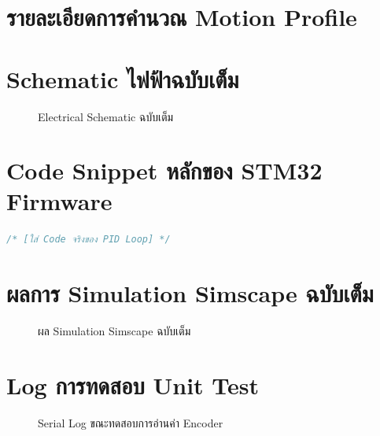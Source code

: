 \section{รายละเอียดการคำนวณ Motion Profile}
\label{sec:motion_profile_calculation_details}

\section{Schematic ไฟฟ้าฉบับเต็ม}
\label{sec:full_electrical_schematic}

\begin{figure}[H]
  \centering
  \caption{Electrical Schematic ฉบับเต็ม}
  \label{fig:schematic_full}
\end{figure}

\section{Code Snippet หลักของ STM32 Firmware}
\label{sec:firmware_code_snippets}

\begin{lstlisting}[language=C, caption={ตัวอย่าง PID Control Loop บน STM32}]
/* [ใส่ Code จริงของ PID Loop] */
\end{lstlisting}

\section{ผลการ Simulation Simscape ฉบับเต็ม}
\label{sec:simscape_simulation_results}

\begin{figure}[H]
  \centering
  \caption{ผล Simulation Simscape ฉบับเต็ม}
  \label{fig:simscape_full}
\end{figure}

\section{Log การทดสอบ Unit Test}
\label{sec:unit_test_logs}

\begin{figure}[H]
  \centering
  \caption{Serial Log ขณะทดสอบการอ่านค่า Encoder}
  \label{fig:serial_log}
\end{figure}